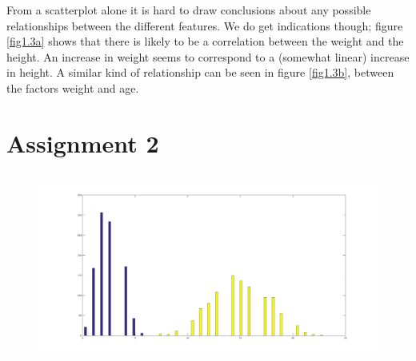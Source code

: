 \documentclass{article}
\begin{document}
From a scatterplot alone it is hard to draw conclusions about any possible relationships between the different features. 
We do get indications though; figure \ref{fig1.3a} shows that there is likely to be a correlation between the weight and the height.
An increase in weight seems to correspond to a (somewhat linear) increase in height. 
A similar kind of relationship can be seen in figure \ref{fig1.3b}, between the factors weight and age.

\section{Assignment 2}
\subsection{}

\subsection{}
\subsection{}
\subsection{}
\begin{figure}[H]
\centering
\includegraphics[width=\linewidth]{plot2_4.png}
\label{fig1.4b}
\end{figure}
\subsection{}
\subsection{}
\subsection{}
\subsection{}
\end{document}
